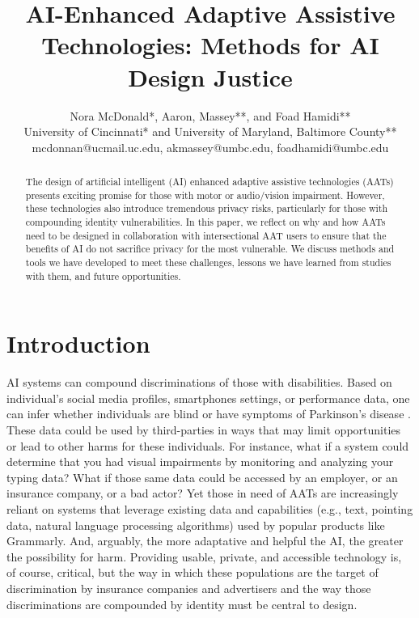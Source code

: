\documentclass[11pt,dvipdfm]{article}
\begin{document}
\title{AI-Enhanced Adaptive Assistive Technologies: Methods for AI Design Justice}
\author{Nora McDonald*, Aaron, Massey**, and Foad Hamidi**\\ 
University of Cincinnati* and University of Maryland, Baltimore County**\\ 
mcdonnan@ucmail.uc.edu, akmassey@umbc.edu, foadhamidi@umbc.edu}


\maketitle
\begin{abstract}
The design of artificial intelligent (AI) enhanced adaptive assistive technologies (AATs) presents exciting promise for those with motor or audio/vision impairment. However, these technologies also introduce tremendous privacy risks, particularly for those with compounding identity vulnerabilities. In this paper, we reflect on why and how AATs need to be designed in collaboration with intersectional AAT users to ensure that the benefits of AI do not sacrifice privacy for the most vulnerable. We discuss methods and tools we have developed to meet these challenges, lessons we have learned from studies with them, and future opportunities.
\end{abstract}

\section{Introduction}
AI systems can compound discriminations of those with disabilities. Based on individual’s social media profiles, smartphones settings, or performance data, one can infer whether individuals are blind \cite{40} or have symptoms of Parkinson’s disease \cite{45}. These data could be used by third-parties in ways that may limit opportunities or lead to other harms for these individuals. For instance, what if a system could determine that you had visual impairments by monitoring and analyzing your typing data? What if those same data could be accessed by an employer, or an insurance company, or a bad actor? Yet those in need of AATs are increasingly reliant on systems that leverage existing data and capabilities (e.g., text, pointing data, natural language processing algorithms) used by popular products like Grammarly. And, arguably, the more adaptative and helpful the AI, the greater the possibility for harm. Providing usable, private, and accessible technology is, of course, critical, but the way in which these populations are the target of discrimination by insurance companies and advertisers and the way those discriminations are compounded by identity must be central to design.
\end{document}
